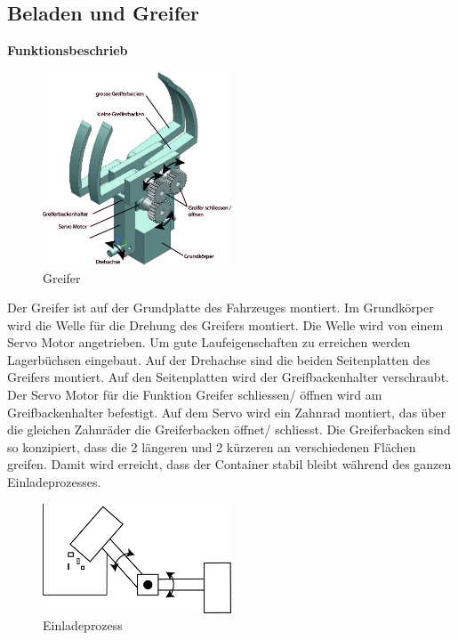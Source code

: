 \subsection{Beladen und Greifer}

\textbf{Funktionsbeschrieb}\\[0.2cm]
\begin{figure}[H]
\centering
\includegraphics[width=0.5\textwidth]{03_Loesungskonzept/pictures/greifer3.jpg}
\caption{Greifer}
\end{figure}

Der Greifer ist auf der Grundplatte des Fahrzeuges montiert. Im Grundkörper wird die Welle für die Drehung des Greifers montiert. Die Welle wird von einem Servo Motor angetrieben. Um gute Laufeigenschaften zu erreichen werden Lagerbüchsen eingebaut. Auf der Drehachse sind die beiden Seitenplatten des Greifers montiert. Auf den Seitenplatten wird der Greifbackenhalter verschraubt.  Der Servo Motor für die Funktion Greifer schliessen/ öffnen wird am Greifbackenhalter befestigt. Auf dem Servo wird ein Zahnrad montiert, das über die gleichen Zahnräder die Greiferbacken öffnet/ schliesst. Die Greiferbacken sind so konzipiert, dass die 2 längeren und 2 kürzeren an verschiedenen Flächen greifen. Damit wird erreicht, dass der Container stabil bleibt während des ganzen Einladeprozesses. 

\begin{figure}[H]
\centering
\includegraphics[width=0.5\textwidth]{03_Loesungskonzept/pictures/Beladen_1.png}
\caption{Einladeprozess}
\end{figure}


